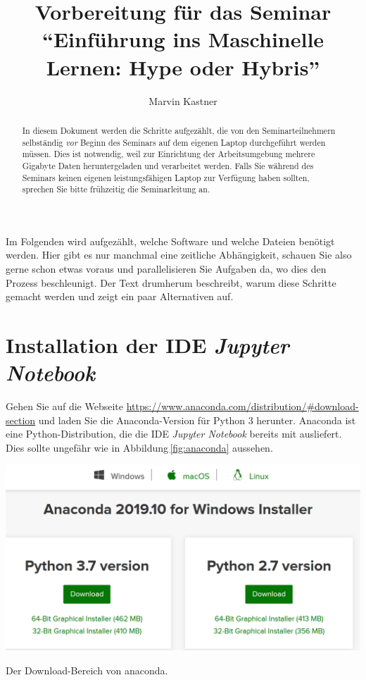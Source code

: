 \documentclass{tufte-handout}
\title{Vorbereitung für das Seminar \enquote{Einführung ins Maschinelle Lernen: Hype oder Hybris}}
\author{Marvin Kastner}
\begin{document}
\maketitle%

\begin{abstract}
\noindent
In diesem Dokument werden die Schritte aufgezählt, die von den Seminarteilnehmern selbständig \emph{vor} Beginn des Seminars auf dem eigenen Laptop durchgeführt werden müssen.
Dies ist notwendig, weil zur Einrichtung der Arbeitsumgebung mehrere Gigabyte Daten heruntergeladen und verarbeitet werden.
Falls Sie während des Seminars keinen eigenen leistungsfähigen Laptop zur Verfügung haben sollten, sprechen Sie bitte frühzeitig die Seminarleitung an.
\end{abstract}

Im Folgenden wird aufgezählt, welche Software und welche Dateien benötigt werden.
Hier gibt es nur manchmal eine zeitliche Abhängigkeit, schauen Sie also gerne schon etwas voraus und parallelisieren Sie Aufgaben da, wo dies den Prozess beschleunigt.
Der Text drumherum beschreibt, warum diese Schritte gemacht werden und zeigt ein paar Alternativen auf.

\section{Installation der IDE \emph{Jupyter Notebook}}

Gehen Sie auf die Webseite
\url{https://www.anaconda.com/distribution/#download-section} 
und laden Sie die Anaconda-Version für Python 3 herunter.
Anaconda ist eine Python-Distribution, die die IDE \emph{Jupyter Notebook} bereits mit ausliefert.
Dies sollte ungefähr wie in Abbildung\,\ref{fig:anaconda} aussehen.

\begin{marginfigure}
  \includegraphics{anaconda}
  \caption{Der Download-Bereich von anaconda.}%
\label{fig:anaconda}
\end{marginfigure}
\end{document}
